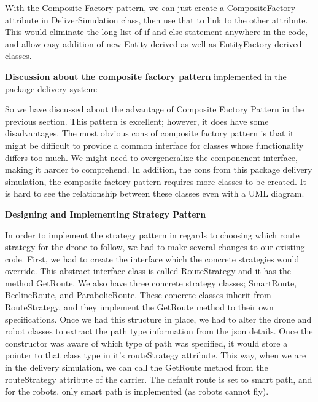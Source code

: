 \begin{center} \end{center} 

With the Composite Factory pattern, we can just create a Composite\+Factory attribute in Deliver\+Simulation class, then use that to link to the other attribute. This would eliminate the long list of if and else statement anywhere in the code, and allow easy addition of new Entity derived as well as Entity\+Factory derived classes.

{\bfseries Discussion about the composite factory pattern} implemented in the package delivery system\+:

So we have discussed about the advantage of Composite Factory Pattern in the previous section. This pattern is excellent; however, it does have some disadvantages. The most obvious cons of composite factory pattern is that it might be difficult to provide a common interface for classes whose functionality differs too much. We might need to overgeneralize the componenent interface, making it harder to comprehend. In addition, the cons from this package delivery simulation, the composite factory pattern requires more classes to be created. It is hard to see the relationship between these classes even with a U\+ML diagram.

{\bfseries Designing and Implementing Strategy Pattern} ~\newline


In order to implement the strategy pattern in regards to choosing which route strategy for the drone to follow, we had to make several changes to our existing code. First, we had to create the interface which the concrete strategies would override. This abstract interface class is called Route\+Strategy and it has the method Get\+Route. We also have three concrete strategy classes; Smart\+Route, Beeline\+Route, and Parabolic\+Route. These concrete classes inherit from Route\+Strategy, and they implement the Get\+Route method to their own specifications. Once we had this structure in place, we had to alter the drone and robot classes to extract the path type information from the json details. Once the constructor was aware of which type of path was specified, it would store a pointer to that class type in it’s route\+Strategy attribute. This way, when we are in the delivery simulation, we can call the Get\+Route method from the route\+Strategy attribute of the carrier. The default route is set to smart path, and for the robots, only smart path is implemented (as robots cannot fly).


